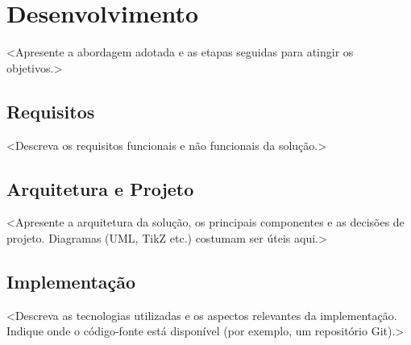 %
\chapter[Desenvolvimento]{Desenvolvimento}\label{ch:desenvolvimento}

<Apresente a abordagem adotada e as etapas seguidas para atingir os objetivos.>

\section{Requisitos}\label{sec:requisitos}

<Descreva os requisitos funcionais e não funcionais da solução.>

\section{Arquitetura e Projeto}\label{sec:arquitetura}

<Apresente a arquitetura da solução, os principais componentes e as decisões
de projeto. Diagramas (UML, TikZ etc.) costumam ser úteis aqui.>

\section{Implementação}\label{sec:implementacao}

<Descreva as tecnologias utilizadas e os aspectos relevantes da implementação.
Indique onde o código-fonte está disponível (por exemplo, um repositório Git).>


